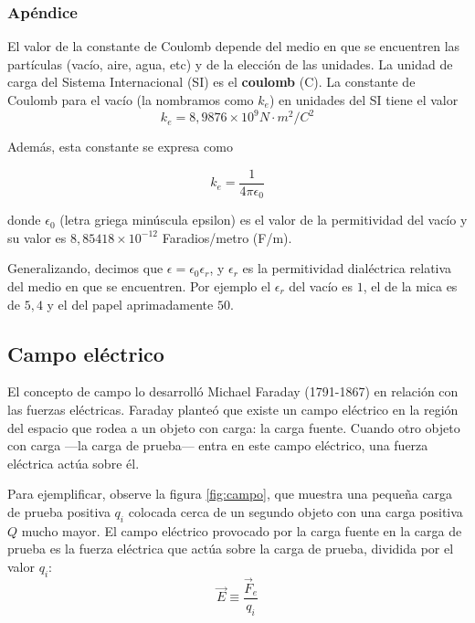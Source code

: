 \documentclass{article}
\begin{document}

\subsubsection*{Apéndice}
El valor de la constante de Coulomb depende del medio en que se encuentren las partículas (vacío, aire, agua, etc) y de la elección de las unidades. La unidad de carga del Sistema Internacional (SI) es el \textbf{coulomb} (C). La constante de Coulomb para el vacío (la nombramos como $k_e$) en unidades del SI tiene el valor
$$k_e = 8,9876 \times 10^9 N \cdot m^2/C^2$$

Además, esta constante se expresa como

$$k_e = \frac{1}{4\pi\epsilon_0} $$ 

donde $\epsilon_0$ (letra griega minúscula epsilon) es el valor de la permitividad del vacío y su valor es $8,85418 \times 10^{-12}$ Faradios/metro (F/m).

Generalizando, decimos que $\epsilon = \epsilon_0\epsilon_r$, y $\epsilon_r$ es la permitividad dialéctrica relativa del medio en que se encuentren. Por ejemplo el $\epsilon_r$ del vacío es $1$, el de la mica es de $5,4$ y el del papel aprimadamente $50$. 


	\subsection{Campo eléctrico}
El concepto de campo lo desarrolló Michael Faraday (1791-1867) en relación con las fuerzas eléctricas. Faraday planteó que existe un campo eléctrico en la región del espacio que rodea a un objeto con carga: la carga fuente. Cuando otro objeto con carga —la carga de prueba— entra en este campo eléctrico, una fuerza eléctrica actúa sobre él. 

Para ejemplificar, observe la figura \ref{fig:campo}, que muestra una pequeña carga de prueba positiva $q_i$ colocada cerca de un segundo objeto con una carga positiva $Q$ mucho mayor. El campo eléctrico provocado por la carga fuente en la carga de prueba es la fuerza eléctrica que actúa sobre la carga de prueba, dividida por el valor $q_i$:
$$
\vec{E}\equiv \frac{\vec{F}_e}{q_i}
$$
\end{document}
